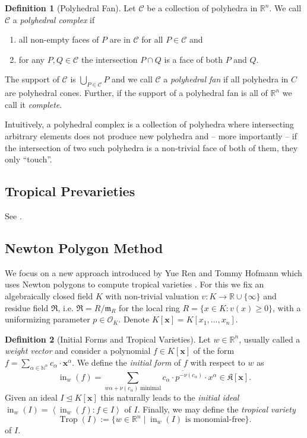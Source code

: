 \documentclass[
  paper=a4,
  DIV=14,
  fontsize=12pt,
  titlepage,
  bibliography=totoc,
  pagesize=pdftex
]{scrartcl}
\numberwithin{figure}{section}
\numberwithin{equation}{section}
\numberwithin{table}{section}
\newcommand*\setR{\mathds{R}}
\newcommand*\setN{\mathds{N}}
\newcommand*\ideal[1]{\left\langle #1 \right\rangle}
\let\vec\mathbf
\let\idealof\trianglelefteq
\DeclareMathOperator{\Trop}{Trop}
\DeclareMathOperator{\initial}{in}
\theoremstyle{definition}
\newtheorem{definition}{Definition}
\numberwithin{definition}{section}
\begin{document}
\begin{definition}[Polyhedral Fan]
  Let $\mathcal C$ be a collection of polyhedra in $\setR^n$. We call $\mathcal C$ a
  \emph{polyhedral complex} if
  \begin{enumerate}
    \item all non-empty faces of $P$ are in $\mathcal C$ for all $P \in \mathcal C$ and
    \item for any $P,Q \in \mathcal C$ the intersection $P\cap Q$ is a face of both $P$
      and $Q$.
  \end{enumerate}
  The support of $\mathcal C$ is $\bigcup_{P\in\mathcal C}P$ and we call $\mathcal C$ a
  \emph{polyhedral fan} if all polyhedra in $C$ are polyhedral cones. Further, if the
  support of a polyhedral fan is all of $\setR^n$ we call it \emph{complete}.
  \label{def:polyhedralFan}
\end{definition}

Intuitively, a polyhedral complex is a collection of polyhedra where intersecting
arbitrary elements does not produce new polyhedra and -- more importantly -- if the
intersection of two such polyhedra is a non-trivial face of both of them, they only
\enquote{touch}.


\subsection{Tropical Prevarieties}

See \cite{compTropVar}.

\subsection{Newton Polygon Method}

We focus on a new approach introduced by Yue Ren and Tommy Hofmann which uses Newton
polygons to compute tropical varieties \cite{tropPointsLinks}. For this we fix an
algebraically closed field $K$ with non-trivial valuation $v:K\to\setR \cup \{\infty\}$
and residue field $\mathfrak R$, i.e. $\mathfrak R = R/\mathfrak m_R$ for the local ring
$R = \{ x \in K : v(x) \geq 0 \}$, with a uniformizing parameter $p\in \mathcal O_K$.
Denote $K[\vec x] = K[x_1, \ldots, x_n]$.


\begin{definition}[Initial Forms and Tropical Varieties]
  Let $w \in \setR^n$, usually called a \emph{weight vector} and consider a polynomial $f
  \in K[\vec x]$ of the form $f = \sum_{\alpha \in \setN^n} c_\alpha \cdot \vec x^\alpha$.
  We define the \emph{initial form} of $f$ with respect to $w$ as
  \[
    \initial_w(f) = \sum_{w\alpha + \nu(c_\alpha) \text{ minimal}}
    \overline{c_\alpha \cdot p^{-\nu(c_\alpha)}} \cdot x^\alpha
    \in \mathfrak K[\vec x].
  \]
  Given an ideal $I \idealof K[\vec x]$ this naturally leads to the \emph{initial ideal}
  $\initial_w(I) = \ideal{\initial_w(f) : f\in I}$ of $I$. Finally, we may define the
  \emph{tropical variety}
  \[
    \Trop(I) := \{ w \in \setR^n \mid \initial_w(I) \text{ is monomial-free} \}.
  \]
  of $I$.
  \label{def:tropicalVarietyVal}
\end{definition}
\end{document}
